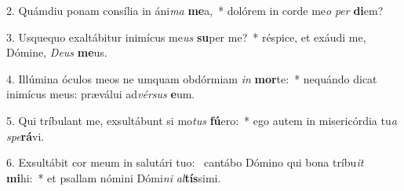 2. Quámdiu ponam consília in áni\textit{ma} \textbf{me}a,~*  dolórem in corde me\textit{o} \textit{per} \textbf{di}em?\

3. Usquequo exaltábitur inimícus me\textit{us} \textbf{su}per me?~*  réspice, et exáudi me, Dómine, \textit{De}\textit{us} \textbf{me}us.\

4. Illúmina óculos meos ne umquam obdórmiam \textit{in} \textbf{mor}te:~*  nequándo dicat inimícus meus: præválui ad\textit{vér}\textit{sus} \textbf{e}um.\

5. Qui tríbulant me, exsultábunt si mo\textit{tus} \textbf{fú}ero:~*  ego autem in misericórdia tu\textit{a} \textit{spe}\textbf{rá}vi.\

6. Exsultábit cor meum in salutári tuo: \dag\  cantábo Dómino qui bona tríbu\textit{it} \textbf{mi}hi:~*  et psallam nómini Dómi\textit{ni} \textit{al}\textbf{tís}simi.\

